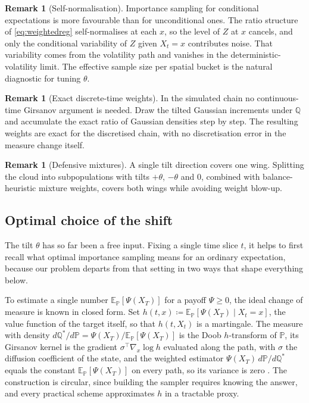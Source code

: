 \documentclass[11pt,a4paper]{article}
\theoremstyle{plain}
\theoremstyle{definition}
\theoremstyle{definition}
\newtheorem{remark}[theorem]{Remark}
\newcommand{\E}{\mathbb{E}}
\newcommand{\Pm}{\mathbb{P}}
\newcommand{\Qm}{\mathbb{Q}}
\begin{document}
\begin{remark}[Self-normalisation]\label{rem:selfnorm}
Importance sampling for conditional expectations is more favourable than for unconditional ones. The ratio structure of \cref{eq:weightedreg} self-normalises at each $x$, so the level of $Z$ at $x$ cancels, and only the conditional variability of $Z$ given $X_t = x$ contributes noise. That variability comes from the volatility path and vanishes in the deterministic-volatility limit. The effective sample size per spatial bucket is the natural diagnostic for tuning $\theta$.
\end{remark}

\begin{remark}[Exact discrete-time weights]\label{rem:discrete}
In the simulated chain no continuous-time Girsanov argument is needed. Draw the tilted Gaussian increments under $\Qm$ and accumulate the exact ratio of Gaussian densities step by step. The resulting weights are exact for the discretised chain, with no discretisation error in the measure change itself.
\end{remark}

\begin{remark}[Defensive mixtures]\label{rem:mixture}
A single tilt direction covers one wing. Splitting the cloud into subpopulations with tilts $+\theta$, $-\theta$ and $0$, combined with balance-heuristic mixture weights, covers both wings while avoiding weight blow-up.
\end{remark}

\subsection{Optimal choice of the shift}\label{subsec:optshift}

The tilt $\theta$ has so far been a free input. Fixing a single time slice $t$, it helps to first recall what optimal importance sampling means for an ordinary expectation, because our problem departs from that setting in two ways that shape everything below.

To estimate a single number $\E_{\Pm}[\Psi(X_T)]$ for a payoff $\Psi \geq 0$, the ideal change of measure is known in closed form. Set $h(t,x) \coloneqq \E_{\Pm}[\Psi(X_T) \mid X_t = x]$, the value function of the target itself, so that $h(t, X_t)$ is a martingale. The measure with density $d\Qm^*/d\Pm = \Psi(X_T)/\E_{\Pm}[\Psi(X_T)]$ is the Doob $h$-transform of $\Pm$, its Girsanov kernel is the gradient $\sigma^{\top}\nabla_x \log h$ evaluated along the path, with $\sigma$ the diffusion coefficient of the state, and the weighted estimator $\Psi(X_T)\,d\Pm/d\Qm^*$ equals the constant $\E_{\Pm}[\Psi(X_T)]$ on every path, so its variance is zero \citep[Ch.~4]{glasserman2003}. The construction is circular, since building the sampler requires knowing the answer, and every practical scheme approximates $h$ in a tractable proxy.
\end{document}

